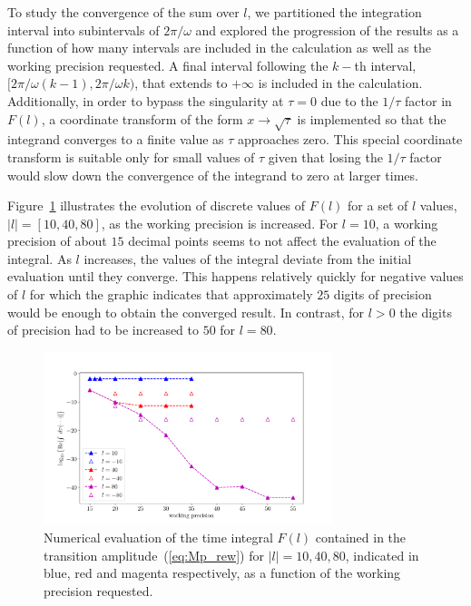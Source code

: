 To study the convergence of the sum over $l$, we partitioned the
integration interval into subintervals of $2\pi/\omega$ and explored
the progression of the results as a function of how many intervals are
included in the calculation as well as the working precision
requested. A final interval following the $k-$th interval,
$[2\pi/\omega (k-1), 2\pi/\omega k)$, that extends to $+\infty$ is
  included in the calculation. Additionally, in order to bypass the
  singularity at $\tau = 0$ due to the $1/\tau$ factor in $F(l)$, a
  coordinate transform of the form $x \to \sqrt{\tau}$ is implemented
  so that the integrand converges to a finite value as $\tau$
  approaches zero. This special coordinate transform is suitable only
  for small values of $\tau$ given that losing the $1/\tau$ factor
  would slow down the convergence of the integrand to zero at larger
  times.



Figure~\ref{fig:WP_convergence} illustrates the evolution of discrete
values of $F(l)$ for a set of $l$ values, $|l| = [10, 40, 80]$, as the
working precision is increased. For $l=10$, a working precision of
about $15$ decimal points seems to not affect the evaluation of the
integral. As $l$ increases, the values of the integral deviate from
the initial evaluation until they converge. This happens relatively
quickly for negative values of $l$ for which the graphic indicates
that approximately $25$ digits of precision would be enough to obtain
the converged result. In contrast, for $l>0$ the digits of precision
had to be increased to $50$ for $l = 80$.

\begin{figure}
  \centering
  \includegraphics[width=0.75\textwidth]{figures/ch_ATI_SFA/He/n512PG25MR35l_pm104080logRe}
  \caption{Numerical evaluation of the time integral $F(l)$ contained
    in the transition amplitude~(\ref{eq:Mp_rew}) for $|l| = 10, 40,
    80$, indicated in blue, red and magenta respectively, as a
    function of the working precision requested.}
  \label{fig:WP_convergence}
\end{figure}


